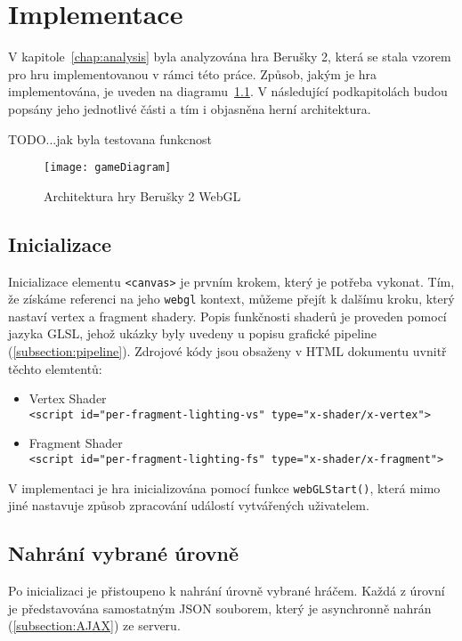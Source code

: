 \chapter{Implementace}
\label{chap:implementace}
V kapitole~\ref{chap:analysis} byla analyzována hra Berušky 2, která se stala vzorem pro hru implementovanou v rámci této práce. Způsob, jakým je hra implementována, je uveden na diagramu~\ref{fig:gameDiagram}. V následující podkapitolách budou popsány jeho jednotlivé části a tím i objasněna herní architektura.

TODO...jak byla testovana funkcnost

\begin{figure}[htb]
\centering
\texttt{[image: gameDiagram]}
\caption{Architektura hry Berušky 2 WebGL}
\label{fig:gameDiagram}
\end{figure}

\section{Inicializace}
Inicializace elementu \texttt{<canvas>} je prvním krokem, který je potřeba vykonat. Tím, že získáme referenci na jeho \texttt{webgl} kontext, můžeme přejít k dalšímu kroku, který nastaví vertex a fragment shadery. Popis funkčnosti shaderů je proveden pomocí jazyka GLSL, jehož ukázky byly uvedeny u popisu grafické pipeline (\ref{subsection:pipeline}). Zdrojové kódy jsou obsaženy v HTML dokumentu uvnitř těchto elemtentů:
\begin{itemize}
\item Vertex Shader \\ \texttt{\textless script id="per-fragment-lighting-vs"\ type="x-shader/x-vertex"\textgreater}
\item Fragment Shader \\ \texttt{\textless script id="per-fragment-lighting-fs"\ type="x-shader/x-fragment"\textgreater}
\end{itemize}

V implementaci je hra inicializována pomocí funkce \texttt{webGLStart()}, která mimo jiné nastavuje způsob zpracování událostí vytvářených uživatelem.

\section{Nahrání vybrané úrovně}
Po inicializaci je přistoupeno k nahrání úrovně vybrané hráčem. Každá z úrovní je představována samostatným JSON souborem, který je asynchronně nahrán (\ref{subsection:AJAX}) ze serveru.

